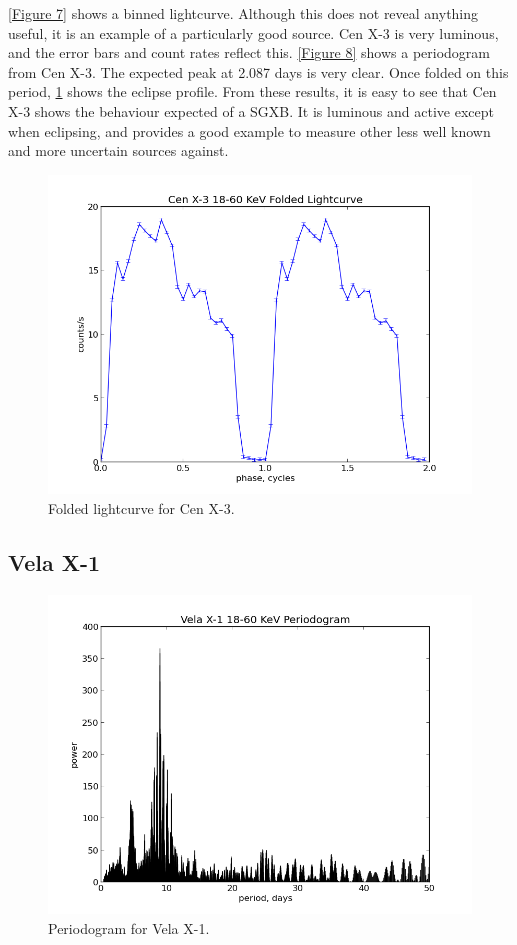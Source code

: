 \ref{Figure 7} shows a binned lightcurve. Although this does not reveal anything useful, it is an example of a particularly good source. Cen X-3 is very luminous, and the error bars and count rates reflect this. \ref{Figure 8} shows a periodogram from Cen X-3. The expected peak at 2.087 days is very clear. Once folded on this period, \ref{Figure 9} shows the eclipse profile. From these results, it is easy to see that Cen X-3 shows the behaviour expected of a SGXB. It is luminous and active except when eclipsing, and provides a good example to measure other less well known and more uncertain sources against. 

\begin{figure}[h!]
\centering
\includegraphics[width=130mm]{gfx/Fig9.png}
\caption{Folded lightcurve for Cen X-3.}
\label{Figure 9}
\end{figure} 

\clearpage
\subsection{Vela X-1}

\begin{figure}[h!]
\centering
\includegraphics[width=130mm]{gfx/Fig10.png}
\caption{Periodogram for Vela X-1.}
\label{Figure 10}
\end{figure} 

